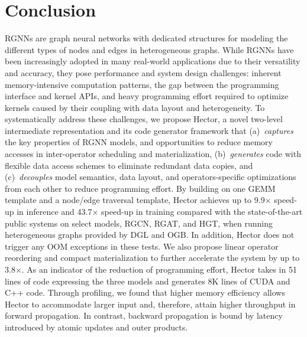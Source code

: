 \section{Conclusion}
RGNNs are graph neural networks with dedicated structures for modeling the different types of nodes and edges in heterogeneous graphs. While RGNNs have been increasingly adopted in many real-world applications due to their versatility and accuracy, they pose performance and system design challenges: inherent memory-intensive computation patterns, the gap between the programming interface and kernel APIs, and heavy programming effort required to optimize kernels caused by their coupling with data layout and heterogeneity. To systematically address these challenges, we propose Hector, a novel two-level intermediate representation and its code generator framework that 
(a)~\textit{captures} the key properties of RGNN models, and opportunities to reduce memory accesses in inter-operator scheduling and materialization,
(b)~\textit{generates} code with flexible data access schemes to eliminate redundant data copies, and
(c)~\textit{decouples} model semantics, data layout, and operators-specific optimizations from each other to reduce programming effort. 
By building on one GEMM template and a node/edge traversal template, Hector achieves up to 9.9$\times$ speed-up in inference and 43.7$\times$ speed-up in training compared with the state-of-the-art public systems on select models, RGCN, RGAT, and HGT, when running heterogeneous graphs provided by DGL and OGB. 
In addition, Hector does not trigger any OOM exceptions in these tests. 
We also propose linear operator reordering and compact materialization to further accelerate the system by up to 3.8$\times$. 
As an indicator of the reduction of programming effort, Hector takes in 51 lines of code expressing the three models and generates 8K lines of CUDA and C++ code.
Through profiling, we found that higher memory efficiency allows Hector to accommodate larger input and, therefore, attain higher throughput in forward propagation. In contrast, backward propagation is bound by latency introduced by atomic updates and outer products.


